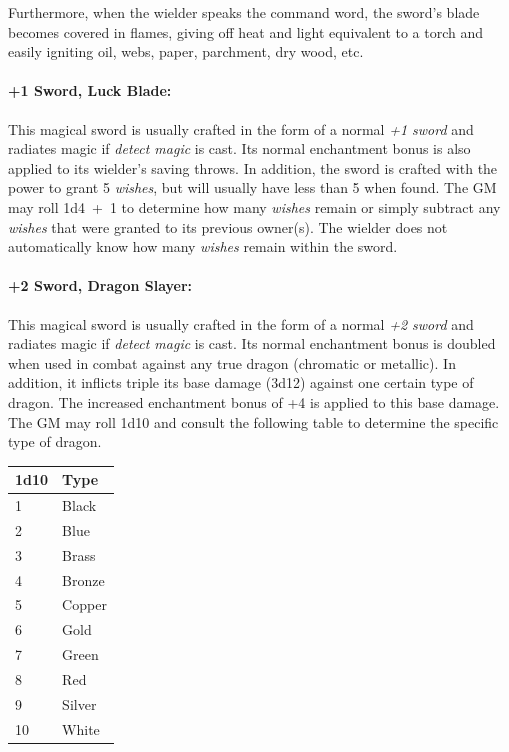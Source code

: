 \begin{multicols}{2}
Furthermore, when the wielder speaks the command word, the sword's blade becomes covered in flames, giving off heat and light equivalent to a torch and easily igniting oil, webs, paper, parchment, dry wood, etc.
 
\paragraph{+1 Sword, Luck Blade:} This magical sword is usually crafted in the form of a normal \textit{+1 sword} and radiates magic if \textit{detect magic} is cast.  Its normal enchantment bonus is also applied to its wielder's saving throws.  In addition, the sword is crafted with the power to grant 5 \textit{wishes}, but will usually have less than 5 when found.  The GM may roll 1d4~+~1 to determine how many \textit{wishes} remain or simply subtract any \textit{wishes} that were granted to its previous owner(s).  The wielder does not automatically know how many \textit{wishes} remain within the sword.

\paragraph{+2 Sword, Dragon Slayer:} This magical sword is usually crafted in the form of a normal \textit{+2 sword} and radiates magic if \textit{detect magic} is cast.  Its normal enchantment bonus is doubled when used in combat against any true dragon (chromatic or metallic).  In addition, it inflicts triple its base damage (3d12) against one certain type of dragon.  The increased enchantment bonus of +4 is applied to this base damage.  The GM may roll 1d10 and consult the following table to determine the specific type of dragon.
 
\noindent \begin{tabular}{|p{}|p{}|}
\hline
1d10	& Type \\
\hline\hline
\rowcolor[gray]{0.9}1	& Black \\
2	& Blue \\
\rowcolor[gray]{0.9}3	& Brass \\
4	& Bronze \\
\rowcolor[gray]{0.9}5	& Copper \\
6	& Gold \\
\rowcolor[gray]{0.9}7	& Green \\
8	& Red \\
\rowcolor[gray]{0.9}9	& Silver \\
10	& White \\
\hline
\end{tabular}


\end{multicols}
